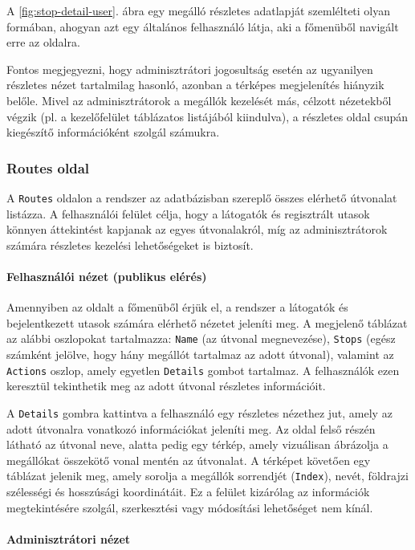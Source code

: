 A \ref{fig:stop-detail-user}. ábra egy megálló részletes adatlapját szemlélteti olyan formában, ahogyan azt egy általános felhasználó látja, aki a főmenüből navigált erre az oldalra.

Fontos megjegyezni, hogy adminisztrátori jogosultság esetén az ugyanilyen részletes nézet tartalmilag hasonló, azonban a térképes megjelenítés hiányzik belőle. Mivel az adminisztrátorok a megállók kezelését más, célzott nézetekből végzik (pl. a kezelőfelület táblázatos listájából kiindulva), a részletes oldal csupán kiegészítő információként szolgál számukra.


\subsubsection{Routes oldal}

A \texttt{Routes} oldalon a rendszer az adatbázisban szereplő összes elérhető útvonalat listázza. A felhasználói felület célja, hogy a látogatók és regisztrált utasok könnyen áttekintést kapjanak az egyes útvonalakról, míg az adminisztrátorok számára részletes kezelési lehetőségeket is biztosít.

\paragraph{Felhasználói nézet (publikus elérés)}

Amennyiben az oldalt a főmenüből érjük el, a rendszer a látogatók és bejelentkezett utasok számára elérhető nézetet jeleníti meg. A megjelenő táblázat az alábbi oszlopokat tartalmazza: \texttt{Name} (az útvonal megnevezése), \texttt{Stops} (egész számként jelölve, hogy hány megállót tartalmaz az adott útvonal), valamint az \texttt{Actions} oszlop, amely egyetlen \texttt{Details} gombot tartalmaz. A felhasználók ezen keresztül tekinthetik meg az adott útvonal részletes információit.

A \texttt{Details} gombra kattintva a felhasználó egy részletes nézethez jut, amely az adott útvonalra vonatkozó információkat jeleníti meg. Az oldal felső részén látható az útvonal neve, alatta pedig egy térkép, amely vizuálisan ábrázolja a megállókat összekötő vonal mentén az útvonalat. A térképet követően egy táblázat jelenik meg, amely sorolja a megállók sorrendjét (\texttt{Index}), nevét, földrajzi szélességi és hosszúsági koordinátáit. Ez a felület kizárólag az információk megtekintésére szolgál, szerkesztési vagy módosítási lehetőséget nem kínál.

\paragraph{Adminisztrátori nézet}

